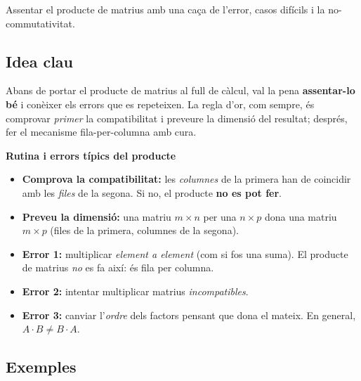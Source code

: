 %
{Assentar el producte de matrius amb una caça de l'error, casos difícils i la no-commutativitat.}

\subsection{Idea clau}

Abans de portar el producte de matrius al full de càlcul, val la pena
\textbf{assentar-lo bé} i conèixer els errors que es repeteixen. La regla d'or, com
sempre, és comprovar \emph{primer} la compatibilitat i preveure la dimensió del
resultat; després, fer el mecanisme fila-per-columna amb cura.

\begin{idea}
\textbf{Rutina i errors típics del producte}
\begin{itemize}[leftmargin=1.4em, itemsep=2pt]
  \item \textbf{Comprova la compatibilitat:} les \emph{columnes} de la primera han
        de coincidir amb les \emph{files} de la segona. Si no, el producte
        \textbf{no es pot fer}.
  \item \textbf{Preveu la dimensió:} una matriu $m\times n$ per una $n\times p$
        dona una matriu $m\times p$ (files de la primera, columnes de la segona).
  \item \textbf{Error 1:} multiplicar \emph{element a element} (com si fos una
        suma). El producte de matrius \emph{no} es fa així: és fila per columna.
  \item \textbf{Error 2:} intentar multiplicar matrius \emph{incompatibles}.
  \item \textbf{Error 3:} canviar l'\emph{ordre} dels factors pensant que dona el
        mateix. En general, $A\cdot B\neq B\cdot A$.
\end{itemize}
\end{idea}

\subsection{Exemples}

